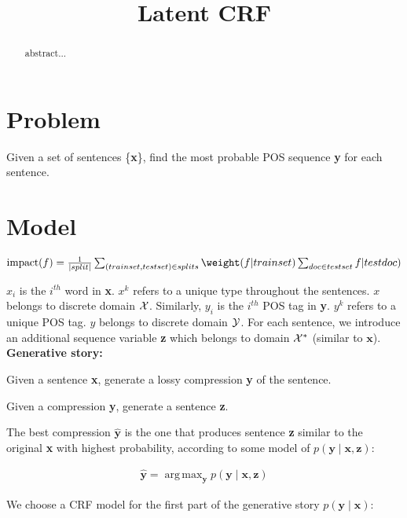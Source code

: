 \documentclass[11pt,onecolumn]{article}
\title{Latent CRF}
\date{}
\DeclareMathOperator*{\argmax}{arg\,max}
\DeclareMathOperator*{\impact}{impact}
\newenvironment{itemizesquish}{\begin{list}{\labelitemi}{\setlength{\itemsep}{0em}\setlength{\labelwidth}{0.5em}\setlength{\leftmargin}{\labelwidth}\addtolength{\leftmargin}{\labelsep}}}{\end{list}}
\begin{document}
\maketitle
\begin{abstract}
abstract...
\end{abstract}

\section{Problem}

Given a set of sentences \{\textbf{x}\}, find the most probable POS sequence \textbf{y} for each sentence. 

\section{Model}

$\impact(f) = \frac{1}{|split|} \sum_{(trainset, testset) \in splits} \weight(f|trainset) \sum_{doc \in testset} \value(f|testdoc)$

$x_i$ is the $i^{th}$ word in \textbf{x}. $x^k$ refers to a unique type throughout the sentences. $x$ belongs to discrete domain $\cal{X}$. 
Similarly, $y_i$ is the $i^{th}$ POS tag in \textbf{y}. $y^k$ refers to a unique POS tag. $y$ belongs to discrete domain $\cal{Y}$. 
For each sentence, we introduce an additional sequence variable \textbf{z} which belongs to domain $\cal{X}^*$ (similar to $\mathbf{x}$).\\


\textbf{Generative story:}
\begin{itemizesquish}
\item Given a sentence \textbf{x}, generate a lossy compression \textbf{y} of the sentence.
\item Given a compression \textbf{y}, generate a sentence \textbf{z}.
\end{itemizesquish}

The best compression $\hat{\mathbf{y}}$ is the one that produces sentence \textbf{z} similar to the original \textbf{x} with highest probability, according to some model of $p(\mathbf{y} \mid \mathbf{x}, \mathbf{z})$:

\begin{eqnarray}
\hat{\mathbf{y}} = \argmax_\mathbf{y} p(\mathbf{y} \mid \mathbf{x}, \mathbf{z}) 
\end{eqnarray}

We choose a CRF model for the first part of the generative story $p(\mathbf{y} \mid \mathbf{x})$:
\end{document}
